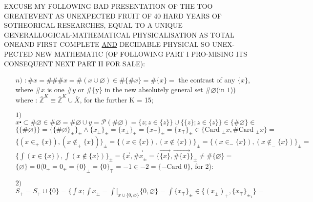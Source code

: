 \documentclass{article}
\begin{document}
\large
\noindent
EXCUSE MY FOLLOWING \guillemotleft BAD\guillemotright {} PRESENTATION OF THE TOO GREAT\linebreak EVENT AS UNEXPECTED FRUIT OF 40 HARD YEARS OF SO\linebreak THEORICAL RESEARCHES, EQUAL TO A UNIQUE GENERAL\linebreak LOGICAL-MATHEMATICAL PHYSICALISATION AS TOTAL ONE\linebreak AND FIRST COMPLETE \underline{AND} DECIDABLE PHYSICAL SO UNEX-\linebreak PECTED NEW MATHEMATIC (OF FOLLOWING PART I PRO-\linebreak MISING ITS CONSEQUENT NEXT PART II FOR SALE):
\begin{itemize}
    \item[$n)$] $:\#x=\#\#\# x = \#(x\cup  \varnothing ) \in \# \{ \# x \} = \# \{x\}=$ the contrast of any\newline
    $\{x\}$, where $\# x$ is one \guillemotleft $\# y$ or \#\{y\}\guillemotright{} in the new absolutely general \newline
    set $\# \varnothing$(in $1$)) where : $\overline{\mathbb{Z}}^K \equiv \overline{\mathbb{Z}}^K \cup \overline{X}$, for the further K = 15;\newline
    \item[$1)$]  $x \centerdot \subset \# \varnothing\in \#\varnothing = \#\varnothing\cup y= \mathcal{P}(\#\varnothing)=\{z;z\in \{z\}\}\cup \{\{z\};z\in \{z\}\} \in \{\#\varnothing\}\in $\newline
    $\{\{\#\varnothing\}\} = \{\{\#\varnothing\}_\pm\}_\pm \wedge \{x_\pm\}_\pm = \{x_\pm\}_\mp =\{x_\mp\}_\pm =\{x_\mp\}_\pm \in \{\text{Card }_\pm x, \# \text{Card }_\pm x \} = $\newline
    $\{(x\in_+ \{x\}),(x\notin_+ \{x\})\}_\pm = \{(x\in \{x\}),(x\notin\{x\})\}_\pm= \{(x\in_- \{x\}),(x\notin_- \{x\})\}_\pm =$  \newline
    $\{ \int (x\in \{x\}), \int (x\notin \{x\})\}_\pm = \{ \overrightarrow{x}, \overrightarrow{\# x}_\pm = \{  \overrightarrow{\{x\}},  \overrightarrow{\# \{x\}}\}_\pm \neq \# \{\varnothing\}=  $\newline
    $\{\varnothing\}= 0 \langle 0_\pm = 0_\mp = \{0\}_\pm = \{0\}_\mp = -1 \in -2 = \{-\text{Card } 0\}$, for 2):
    \item[$2)$] $S_+ = S_+ \cup \{ 0 \} = \{\int x ; \int x_\pm = \int \bigl[_{x\cup \{0,\varnothing\}} \{0,\varnothing\} = \int \{x_\mp\}_\pm \in \{(x_\pm)_+ , \{x_\mp\}_{\pm_1}\}=$ \newline

\end{itemize}
\end{document}
